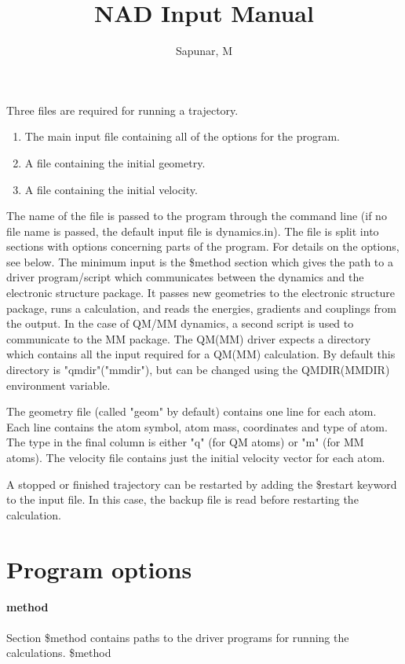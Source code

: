 \documentclass{report}
\title{NAD Input Manual}
\author{Sapunar, M}
\begin{document}
\maketitle

Three files are required for running a trajectory. 
\begin{enumerate} 
	\item The main input file containing all of the options for the program.
	\item A file containing the initial geometry.
	\item A file containing the initial velocity.
\end{enumerate}

The name of the file is passed to the program through the command line (if no file name is passed, the default input file is dynamics.in). The file is split into sections with options concerning parts of the program. For details on the options, see below. The minimum input is the \$method section which gives the path to a driver program/script which communicates between the dynamics and the electronic structure package. It passes new geometries to the electronic structure package, runs a calculation, and reads the energies, gradients and couplings from the output. In the case of QM/MM dynamics, a second script is used to communicate to the MM package. The QM(MM) driver expects a directory which contains all the input required for a QM(MM) calculation. By default this directory is "qmdir"("mmdir"), but can be changed using the QMDIR(MMDIR) environment variable.

The geometry file (called "geom" by default) contains one line for each atom. Each line contains the atom symbol, atom mass, coordinates and type of atom. The type in the final column is either "q" (for QM atoms) or "m" (for MM atoms). The velocity file contains just the initial velocity vector for each atom.

A stopped or finished trajectory can be restarted by adding the \$restart keyword to the input file. In this case, the backup file is read before restarting the calculation.

\section*{Program options}
\paragraph{method}
Section \$method contains paths to the driver programs for running the calculations.  \newline
\$method
\end{document}
